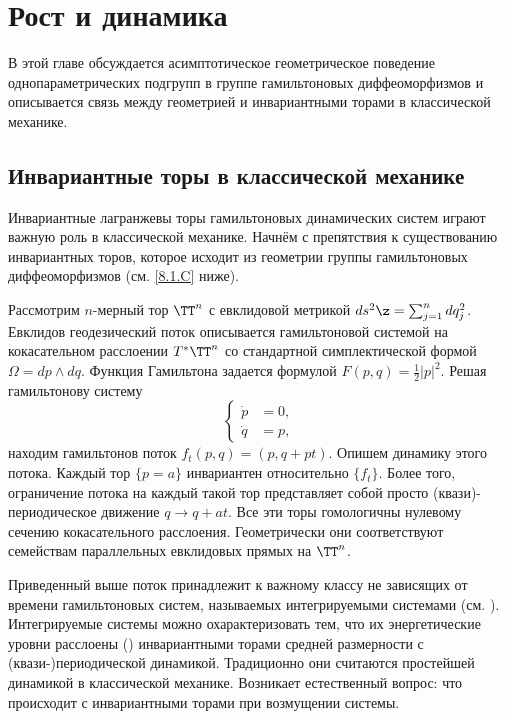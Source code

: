 \chapter{Рост и динамика}

В этой главе обсуждается асимптотическое геометрическое поведение
однопараметрических подгрупп в группе гамильтоновых диффеоморфизмов и
описывается связь между геометрией и инвариантными торами в
классической механике. 

\section{Инвариантные торы в классической механике}

Инвариантные лагранжевы торы гамильтоновых динамических систем играют
важную роль в классической механике. 
Начнём с препятствия к существованию инвариантных торов, которое
исходит из геометрии группы гамильтоновых диффеоморфизмов
(см. \ref{8.1.C} ниже). 

Рассмотрим $n$-мерный тор $\TT^n$ с евклидовой метрикой $ds^2 \z=
\sum^n_{j = 1} dq_j^2$. 
Евклидов геодезический поток описывается гамильтоновой системой на
кокасательном расслоении $T^\ast \TT^n$ со стандартной симплектической
формой $\Omega = dp \wedge dq$. 
Функция Гамильтона задается формулой $F (p, q) = \tfrac12 | p |^2$.
Решая гамильтонову систему 
\[
\begin{cases}
\dot p &= 0,\\
\dot q &= p,
\end{cases}
\]
находим гамильтонов поток $f_t (p, q) = (p, q + pt)$.
Опишем динамику этого потока.
Каждый тор $\{p = a\}$ инвариантен относительно $\{f_t\}$. 
Более того, ограничение потока на каждый такой тор представляет собой
просто (квази)-периодическое движение $q \to q + at$. 
Все эти торы гомологичны нулевому сечению кокасательного расслоения.
Геометрически они соответствуют семействам параллельных евклидовых
прямых на $\TT^n$. 

Приведенный выше поток принадлежит к важному классу не зависящих от
времени гамильтоновых систем, называемых интегрируемыми системами
(см. \cite{Ar}). 
Интегрируемые системы можно охарактеризовать тем, что их
энергетические уровни расслоены ()
инвариантными торами средней размерности с (квази-)периодической
динамикой. 
Традиционно они считаются простейшей динамикой в классической механике.
Возникает естественный вопрос: что происходит с инвариантными торами
при возмущении системы. 

